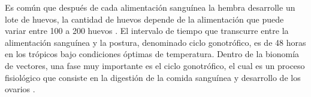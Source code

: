 Es común que después de cada alimentación sanguínea la hembra desarrolle un lote de huevos, la
cantidad de huevos depende de la alimentación que puede variar entre 100 a 200 huevos
\cite{cabezas2005dengue}. El intervalo de tiempo que transcurre entre la alimentación sanguínea y
la postura, denominado ciclo gonotrófico, es de 48 horas en los trópicos bajo condiciones óptimas
de temperatura\cite{ThironIzcazaJ2003}. Dentro de la bionomía de vectores, una fase muy importante
es el ciclo gonotrófico, el cual es un proceso fisiológico que consiste en la digestión de la
comida sanguínea y desarrollo de los ovarios \cite{luevano1993ciclo}.

